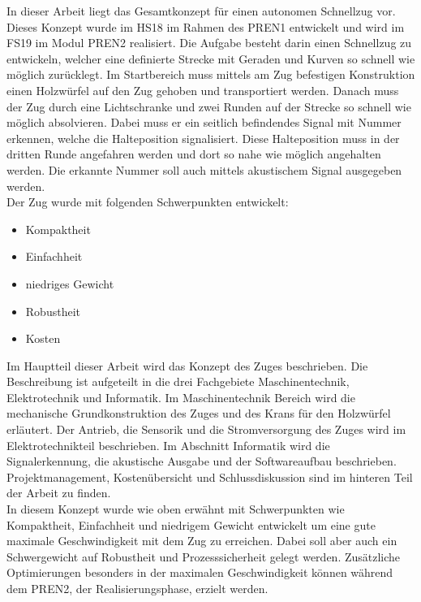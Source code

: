 \documentclass[../../main.tex]{subfiles}
\begin{document}
In dieser Arbeit liegt das Gesamtkonzept für einen autonomen Schnellzug vor. Dieses Konzept wurde im HS18 im Rahmen des PREN1 entwickelt und wird im FS19 im Modul PREN2 realisiert. Die Aufgabe besteht darin einen Schnellzug zu entwickeln, welcher eine definierte Strecke mit Geraden und Kurven so schnell wie möglich zurücklegt. Im Startbereich muss mittels am Zug befestigen Konstruktion einen Holzwürfel auf den Zug gehoben und transportiert werden. Danach muss der Zug durch eine Lichtschranke und zwei Runden auf der Strecke so schnell wie möglich absolvieren. Dabei muss er ein seitlich befindendes Signal mit Nummer erkennen, welche die Halteposition signalisiert. Diese Halteposition muss in der dritten Runde angefahren werden und dort so nahe wie möglich angehalten werden. Die erkannte Nummer soll auch mittels akustischem Signal ausgegeben werden. \\
Der Zug wurde mit folgenden Schwerpunkten entwickelt:
\begin{itemize}
    \item Kompaktheit
    \item Einfachheit
    \item niedriges Gewicht
    \item Robustheit
    \item Kosten
\end{itemize}
Im Hauptteil dieser Arbeit wird das Konzept des Zuges beschrieben. Die Beschreibung ist aufgeteilt in die drei
Fachgebiete Maschinentechnik, Elektrotechnik und Informatik. Im Maschinentechnik Bereich wird die mechanische
Grundkonstruktion des Zuges und des Krans für den Holzwürfel erläutert. Der Antrieb, die Sensorik und die
Stromversorgung des Zuges wird im Elektrotechnikteil beschrieben. Im Abschnitt Informatik wird die Signalerkennung, die
akustische Ausgabe und der Softwareaufbau beschrieben. Projektmanagement, Kostenübersicht und Schlussdiskussion sind im hinteren Teil der Arbeit zu finden.\\
In diesem Konzept wurde wie oben erwähnt mit Schwerpunkten wie Kompaktheit, Einfachheit und niedrigem Gewicht entwickelt um eine gute maximale Geschwindigkeit mit dem Zug zu erreichen. Dabei soll aber auch ein Schwergewicht auf Robustheit und Prozesssicherheit gelegt werden. Zusätzliche Optimierungen besonders in der maximalen Geschwindigkeit können während dem PREN2, der Realisierungsphase, erzielt werden.
\pagebreak
\end{document}
